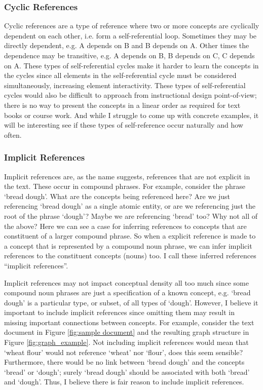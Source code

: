 \documentclass[12pt]{article}
\begin{document}
\subsubsection{Cyclic References}
Cyclic references are a type of reference where two or more concepts are cyclically dependent on each other, i.e. form a self-referential loop. Sometimes they may be directly dependent, e.g. A depends on B and B depends on A. Other times the dependence may be transitive, e.g. A depends on B, B depends on C, C depends on A. These types of self-referential cycles make it harder to learn the concepts in the cycles since all elements in the self-referential cycle must be considered simultaneously, increasing element interactivity. These types of self-referential cycles would also be difficult to approach from instructional design point-of-view; there is no way to present the concepts in a linear order as required for text books or course work. And while I struggle to come up with concrete examples, it will be interesting see if these types of self-reference occur naturally and how often.

\subsubsection{Implicit References}
Implicit references are, as the name suggests, references that are not explicit in the text. These occur in compound phrases. For example, consider the phrase `bread dough'. What are the concepts being referenced here? Are we just referencing `bread dough' as a single atomic entity, or are we referencing just the root of the phrase `dough'? Maybe we are referencing `bread' too? Why not all of the above? Here we can see a case for inferring references to concepts that are constituent of a larger compound phrase. So when a explicit reference is made to a concept that is represented by a compound noun phrase, we can infer implicit references to the constituent concepts (nouns) too. I call these inferred references ``implicit references''. 

Implicit references may not impact conceptual density all too much since some compound noun phrases are just a specification of a known concept, e.g. `bread dough' is a particular type, or subset, of all types of `dough'. However, I believe it important to include implicit references since omitting them may result in missing important connections between concepts. For example, consider the text document in Figure \ref{fig:sample document} and the resulting graph structure in Figure \ref{fig:graph_example}. Not including implicit references would mean that `wheat flour' would not reference `wheat' nor `flour', does this seem sensible? Furthermore, there would be no link between `bread dough' and the concepts `bread' or `dough'; surely `bread dough' should be associated with both `bread' and `dough'. Thus, I believe there is fair reason to include implicit references.
\end{document}
